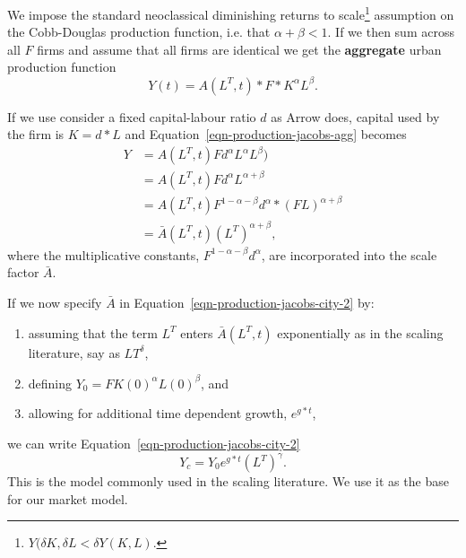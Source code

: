 We impose the standard neoclassical diminishing returns to scale\footnote{$Y(\delta K,\delta L< \delta Y(K,L)$.} assumption on the \gls{Cobb-Douglas} production function, i.e. that 
$\alpha +\beta <1$.  
 If we then sum across all $F$ firms and assume that all firms are identical we get the \textbf{aggregate} urban production function
\begin{equation}
Y(t) = A(L^T, t)* F *K^\alpha L^\beta. 
\label{eqn-production-jacobs-agg}
\end{equation}

If we use consider a fixed capital-labour ratio $d$ as Arrow does,  capital used by the firm is  $K=d*L$ and Equation~\ref{eqn-production-jacobs-agg} becomes
\begin{align}
Y &= A(L^T, t) F d^\alpha L^\alpha L^\beta) \nonumber\\
&=A(L^T, t)F d^\alpha L^{\alpha +\beta} \nonumber\\
&= A(L^T, t) F^{1-\alpha -\beta}d^\alpha * (F L)^{\alpha +\beta} \nonumber \\
&=\bar A(L^T, t) (L^T)^{\alpha +\beta},  
 \label{eqn-production-jacobs-city-2}
\end{align} 
where the  multiplicative constants,  $F^{1-\alpha -\beta}d^\alpha$, are incorporated into the scale factor $\bar A$. 

If we now specify $\bar A$ in Equation~\ref{eqn-production-jacobs-city-2} by: \begin{enumerate}
    \item   assuming that the term $L^T$ enters $\bar A(L^T, t)$ exponentially as in the scaling literature, say as $LT^\delta$,  
    \item defining $Y_0=F K(0)^\alpha L(0)^\beta$, and 
    \item allowing  for additional time dependent growth, $e^{g*t}$,
\end{enumerate}
we can write Equation~\ref{eqn-production-jacobs-city-2} 
\begin{equation}Y_c = Y_0e^{g*t}(L^T)^\gamma. \label{eqn-production-jacobs-scale}
\end{equation}
This is the model commonly used in the scaling literature. We use it as the base for our market model. 



